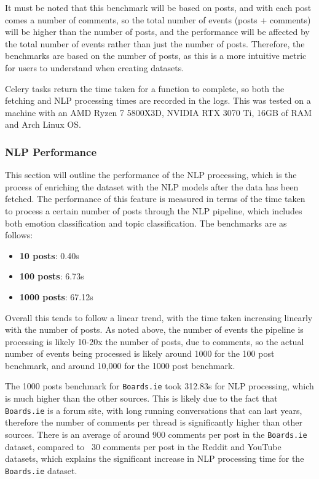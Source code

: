 \documentclass[12pt, a4paper]{article}
\begin{document}
It must be noted that this benchmark will be based on posts, and with each post comes a number of comments, so the total number of events (posts + comments) will be higher than the number of posts, and the performance will be affected by the total number of events rather than just the number of posts. Therefore, the benchmarks are based on the number of posts, as this is a more intuitive metric for users to understand when creating datasets.

Celery tasks return the time taken for a function to complete, so both the fetching and NLP processing times are recorded in the logs. This was tested on a machine with an AMD Ryzen 7 5800X3D, NVIDIA RTX 3070 Ti, 16GB of RAM and Arch Linux OS.

\subsubsection{NLP Performance}
This section will outline the performance of the NLP processing, which is the process of enriching the dataset with the NLP models after the data has been fetched. The performance of this feature is measured in terms of the time taken to process a certain number of posts through the NLP pipeline, which includes both emotion classification and topic classification. The benchmarks are as follows:
\begin{itemize}
    \item \textbf{10 posts}: 0.40s
    \item \textbf{100 posts}: 6.73s
    \item \textbf{1000 posts}: 67.12s
\end{itemize}

Overall this tends to follow a linear trend, with the time taken increasing linearly with the number of posts. As noted above, the number of events the pipeline is processing is likely 10-20x the number of posts, due to comments, so the actual number of events being processed is likely around 1000 for the 100 post benchmark, and around 10,000 for the 1000 post benchmark. 

The 1000 posts benchmark for \texttt{Boards.ie} took 312.83s for NLP processing, which is much higher than the other sources. This is likely due to the fact that \texttt{Boards.ie} is a forum site, with long running conversations that can last years, therefore the number of comments per thread is significantly higher than other sources. There is an average of around 900 comments per post in the \texttt{Boards.ie} dataset, compared to ~30 comments per post in the Reddit and YouTube datasets, which explains the significant increase in NLP processing time for the \texttt{Boards.ie} dataset.
\end{document}
